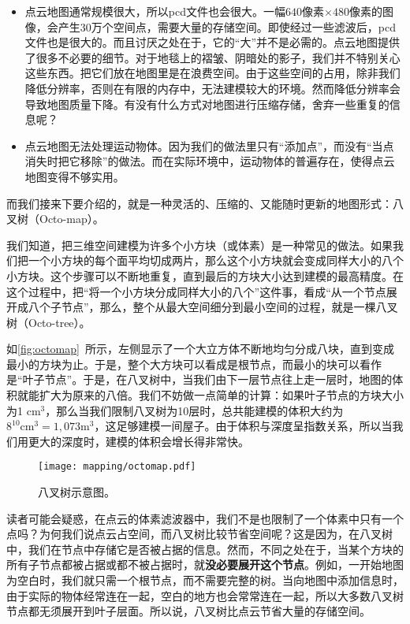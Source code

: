 \begin{itemize}
	\item 点云地图通常规模很大，所以pcd文件也会很大。一幅$640$像素$\times480$像素的图像，会产生30万个空间点，需要大量的存储空间。即使经过一些滤波后，pcd文件也是很大的。而且讨厌之处在于，它的“大”并不是必需的。点云地图提供了很多不必要的细节。对于地毯上的褶皱、阴暗处的影子，我们并不特别关心这些东西。把它们放在地图里是在浪费空间。由于这些空间的占用，除非我们降低分辨率，否则在有限的内存中，无法建模较大的环境。然而降低分辨率会导致地图质量下降。有没有什么方式对地图进行压缩存储，舍弃一些重复的信息呢？
	\item 点云地图无法处理运动物体。因为我们的做法里只有“添加点”，而没有“当点消失时把它移除”的做法。而在实际环境中，运动物体的普遍存在，使得点云地图变得不够实用。
\end{itemize}

而我们接来下要介绍的，就是一种灵活的、压缩的、又能随时更新的地图形式：八叉树（Octo-map）\textsuperscript{\cite{Hornung2013}}。

我们知道，把三维空间建模为许多个小方块（或体素）是一种常见的做法。如果我们把一个小方块的每个面平均切成两片，那么这个小方块就会变成同样大小的八个小方块。这个步骤可以不断地重复，直到最后的方块大小达到建模的最高精度。在这个过程中，把“将一个小方块分成同样大小的八个”这件事，看成“从一个节点展开成八个子节点”，那么，整个从最大空间细分到最小空间的过程，就是一棵八叉树（Octo-tree）。

如\autoref{fig:octomap}~所示，左侧显示了一个大立方体不断地均匀分成八块，直到变成最小的方块为止。于是，整个大方块可以看成是根节点，而最小的块可以看作是“叶子节点”。于是，在八叉树中，当我们由下一层节点往上走一层时，地图的体积就能扩大为原来的八倍。我们不妨做一点简单的计算：如果叶子节点的方块大小为1 cm$^3$，那么当我们限制八叉树为10层时，总共能建模的体积大约为$8^{10}\text{cm}^3 = 1,073\text{m}^3$，这足够建模一间屋子。由于体积与深度呈指数关系，所以当我们用更大的深度时，建模的体积会增长得非常快。

\begin{figure}[!ht]
	\centering
	\texttt{[image: mapping/octomap.pdf]}
	\caption{八叉树示意图。}
	\label{fig:octomap}
\end{figure}

读者可能会疑惑，在点云的体素滤波器中，我们不是也限制了一个体素中只有一个点吗？为何我们说点云占空间，而八叉树比较节省空间呢？这是因为，在八叉树中，我们在节点中存储它是否被占据的信息。然而，不同之处在于，当某个方块的所有子节点都被占据或都不被占据时，就\textbf{没必要展开这个节点}。例如，一开始地图为空白时，我们就只需一个根节点，而不需要完整的树。当向地图中添加信息时，由于实际的物体经常连在一起，空白的地方也会常常连在一起，所以大多数八叉树节点都无须展开到叶子层面。所以说，八叉树比点云节省大量的存储空间。

